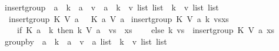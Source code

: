 \begin{isabellebody}
\isadelimproof
%
\endisadelimproof
%
\isatagproof
%
\endisatagproof
{\isafoldproof}%
%
\isadelimproof
%
\endisadelimproof
%
\isadelimdocument
%
\endisadelimdocument
%
\isatagdocument
%
\isamarkuptrue%
%
\endisatagdocument
{\isafolddocument}%
%
\isadelimdocument
%
\endisadelimdocument
{}\isamarkupfalse%
\ insert{\isacharunderscore}{\kern0pt}group\ {\isacharcolon}{\kern0pt}{\isacharcolon}{\kern0pt}\ {\isachardoublequoteopen}{\isacharparenleft}{\kern0pt}{\isacharprime}{\kern0pt}a\ {\isasymRightarrow}\ {\isacharprime}{\kern0pt}k{\isacharparenright}{\kern0pt}\ {\isasymRightarrow}\ {\isacharparenleft}{\kern0pt}{\isacharprime}{\kern0pt}a\ {\isasymRightarrow}\ {\isacharprime}{\kern0pt}v{\isacharparenright}{\kern0pt}\ {\isasymRightarrow}\ {\isacharprime}{\kern0pt}a\ {\isasymRightarrow}\ {\isacharparenleft}{\kern0pt}{\isacharprime}{\kern0pt}k\ {\isasymtimes}\ {\isacharprime}{\kern0pt}v\ list{\isacharparenright}{\kern0pt}\ list\ {\isasymRightarrow}\ {\isacharparenleft}{\kern0pt}{\isacharprime}{\kern0pt}k\ {\isasymtimes}\ {\isacharprime}{\kern0pt}v\ list{\isacharparenright}{\kern0pt}\ list{\isachardoublequoteclose}\ \isanewline
\ \ {\isachardoublequoteopen}insert{\isacharunderscore}{\kern0pt}group\ K\ V\ a\ {\isacharbrackleft}{\kern0pt}{\isacharbrackright}{\kern0pt}\ {\isacharequal}{\kern0pt}\ {\isacharbrackleft}{\kern0pt}{\isacharparenleft}{\kern0pt}K\ a{\isacharcomma}{\kern0pt}\ {\isacharbrackleft}{\kern0pt}V\ a{\isacharbrackright}{\kern0pt}{\isacharparenright}{\kern0pt}{\isacharbrackright}{\kern0pt}{\isachardoublequoteclose}\isanewline
{\isacharbar}{\kern0pt}\ {\isachardoublequoteopen}insert{\isacharunderscore}{\kern0pt}group\ K\ V\ a\ {\isacharparenleft}{\kern0pt}{\isacharparenleft}{\kern0pt}k{\isacharcomma}{\kern0pt}\ vs{\isacharparenright}{\kern0pt}{\isacharhash}{\kern0pt}xs{\isacharparenright}{\kern0pt}\ {\isacharequal}{\kern0pt}\ {\isacharparenleft}{\kern0pt}\isanewline
\ \ \ \ if\ K\ a\ {\isacharequal}{\kern0pt}\ k\ then\ {\isacharparenleft}{\kern0pt}k{\isacharcomma}{\kern0pt}\ V\ a\ {\isacharhash}{\kern0pt}\ vs{\isacharparenright}{\kern0pt}\ {\isacharhash}{\kern0pt}\ xs\isanewline
\ \ \ \ else\ {\isacharparenleft}{\kern0pt}k{\isacharcomma}{\kern0pt}\ vs{\isacharparenright}{\kern0pt}\ {\isacharhash}{\kern0pt}\ insert{\isacharunderscore}{\kern0pt}group\ K\ V\ a\ xs\ \ \isanewline
\ \ {\isacharparenright}{\kern0pt}{\isachardoublequoteclose}\isanewline
\isanewline
{}\isamarkupfalse%
\ group{\isacharunderscore}{\kern0pt}by\ {\isacharcolon}{\kern0pt}{\isacharcolon}{\kern0pt}\ {\isachardoublequoteopen}{\isacharparenleft}{\kern0pt}{\isacharprime}{\kern0pt}a\ {\isasymRightarrow}\ {\isacharprime}{\kern0pt}k{\isacharparenright}{\kern0pt}\ {\isasymRightarrow}\ {\isacharparenleft}{\kern0pt}{\isacharprime}{\kern0pt}a\ {\isasymRightarrow}\ {\isacharprime}{\kern0pt}v{\isacharparenright}{\kern0pt}\ {\isasymRightarrow}\ {\isacharprime}{\kern0pt}a\ list\ {\isasymRightarrow}\ {\isacharparenleft}{\kern0pt}{\isacharprime}{\kern0pt}k\ {\isasymtimes}\ {\isacharprime}{\kern0pt}v\ list{\isacharparenright}{\kern0pt}\ list{\isachardoublequoteclose}\ \isanewline

\end{isabellebody}
